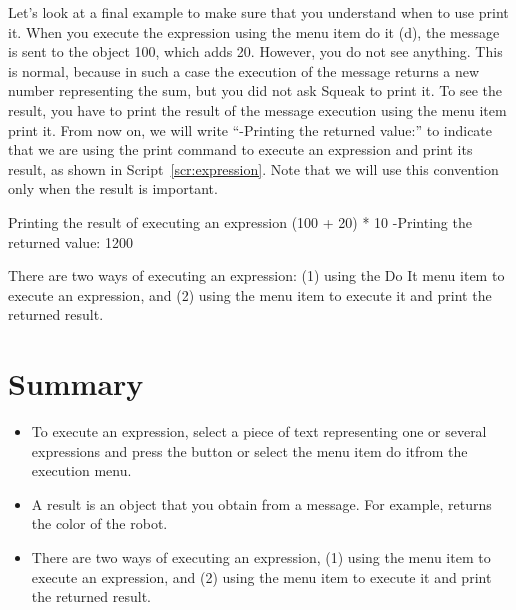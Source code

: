 \documentclass[a4paper,10pt,twoside]{book}
\begin{document}
Let’s look at a final example to make sure that you understand when to use print it. When 
you execute the expression  using the menu item do it (d), the message  is sent to 
the object 100, which adds 20. However, you do not see anything. This is normal, because in 
such a case the execution of the message  returns a new number representing the sum, 
but you did not ask Squeak to print it. To see the result, you have to print the result of the message execution using the menu item print it. From now on, we will write “-Printing the 
returned value:” to indicate that we are using the print command to execute an expression 
and print its result, as shown in Script~\ref{scr:expression}. Note that we will use this convention only when 
the result is important. 

\begin{script}[expression]{Printing the result of executing an expression }
(100 + 20) * 10 
-Printing the returned value: 1200
\end{script}

There are two ways of executing an expression: (1) using the Do It menu item to execute an 
expression, and (2) using the  menu item to execute it and print the returned result. 

\section{Summary}

\begin{itemize}
\item To execute an expression, select a piece of text representing one or several expressions 
and press the  button or select the menu item do itfrom the execution menu. 
\item  A result is an object that you obtain from a message. For example,  returns 
the color of the robot. 

\item  There are two ways of executing an expression, (1) using the  menu item to execute 
an expression, and (2) using the  menu item to execute it and print the returned 
result. 
\end{itemize}


\ifx\wholebook\relax\else
    
\end{document}
